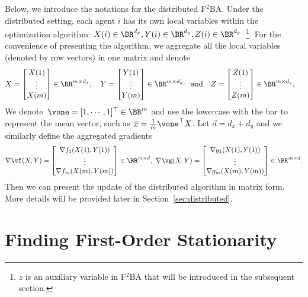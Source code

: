 \documentclass{article}
\begin{document}
Below, we introduce the notations for the distributed F${}^2$BA. 
Under the distributed setting, each agent $i$ has its own local variables within the optimization algorithm: $X(i) \in \BR^{d_x}, Y(i) \in \BR^{d_y},Z(i) \in \BR^{d_y}$~\footnote{$z$ is an auxiliary variable in F${}^2$BA that will be introduced in the subsequent section.}.
For the convenience of presenting the algorithm, we aggregate all the local variables (denoted by row vectors) in one matrix and denote
\begin{align*}
X=\begin{bmatrix}
X(1) \\ \vdots \\ X(m)
\end{bmatrix}&\in\BR^{m\times d_x},
\quad
Y=\begin{bmatrix}
Y(1) \\ \vdots \\ Y(m)
\end{bmatrix}\in\BR^{m\times d_y}
\quad \text{and} \quad
Z=\begin{bmatrix}
Z(1) \\ \vdots \\ Z(m)
\end{bmatrix}\in\BR^{m\times d_y},
\end{align*}
We denote~$\vone = [1,\cdots,1]^\top \in \BR^m$ and use the lowercase with the bar to represent the mean vector, such as $\bar x = \frac{1}{m} \vone^\top X$.
Let $d = d_x+d_y$ and we similarly define the aggregated gradients 
\begin{align*}
\nabla \vf(X,Y)=\begin{bmatrix}
\nabla f_1(X(1),Y(1)) \\ \vdots \\ \nabla f_m(X(m),Y(m))
\end{bmatrix}
\in\BR^{m\times d}, ~\nabla \vg(X,Y)=\begin{bmatrix}
\nabla g_1(X(1),Y(1)) \\ \vdots \\ \nabla g_m(X(m),Y(m))
\end{bmatrix}
\in\BR^{m\times d}.    
\end{align*}
Then we can present the update of the distributed algorithm in matrix form. More details will be provided later in Section~\ref{sec:distributed}.

\section{Finding First-Order Stationarity} \label{sec:first}
\end{document}
